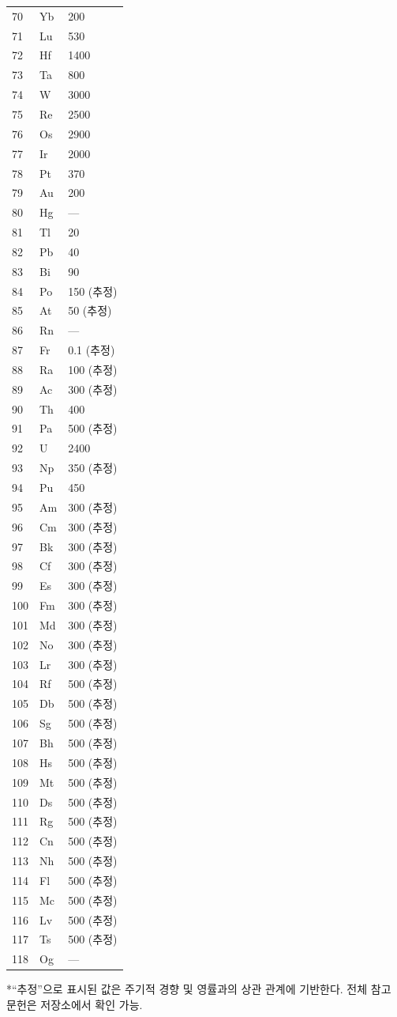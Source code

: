 \documentclass[12pt,a4paper]{article}
\begin{document}
\begin{longtable}{p{0.6cm}p{1.2cm}p{2.5cm}}
		70 & Yb & 200 \\
		71 & Lu & 530 \\
		72 & Hf & 1400 \\
		73 & Ta & 800 \\
		74 & W  & 3000 \\
		75 & Re & 2500 \\
		76 & Os & 2900 \\
		77 & Ir & 2000 \\
		78 & Pt & 370 \\
		79 & Au & 200 \\
		80 & Hg & — \\
		81 & Tl & 20 \\
		82 & Pb & 40 \\
		83 & Bi & 90 \\
		84 & Po & 150 (추정) \\
		85 & At & 50 (추정) \\
		86 & Rn & — \\
		87 & Fr & 0.1 (추정) \\
		88 & Ra & 100 (추정) \\
		89 & Ac & 300 (추정) \\
		90 & Th & 400 \\
		91 & Pa & 500 (추정) \\
		92 & U  & 2400 \\
		93 & Np & 350 (추정) \\
		94 & Pu & 450 \\
		95 & Am & 300 (추정) \\
		96 & Cm & 300 (추정) \\
		97 & Bk & 300 (추정) \\
		98 & Cf & 300 (추정) \\
		99 & Es & 300 (추정) \\
		100& Fm & 300 (추정) \\
		101& Md & 300 (추정) \\
		102& No & 300 (추정) \\
		103& Lr & 300 (추정) \\
		104& Rf & 500 (추정) \\
		105& Db & 500 (추정) \\
		106& Sg & 500 (추정) \\
		107& Bh & 500 (추정) \\
		108& Hs & 500 (추정) \\
		109& Mt & 500 (추정) \\
		110& Ds & 500 (추정) \\
		111& Rg & 500 (추정) \\
		112& Cn & 500 (추정) \\
		113& Nh & 500 (추정) \\
		114& Fl & 500 (추정) \\
		115& Mc & 500 (추정) \\
		116& Lv & 500 (추정) \\
		117& Ts & 500 (추정) \\
		118& Og & — \\
		\bottomrule
	\end{longtable}
	*“추정”으로 표시된 값은 주기적 경향 및 영률과의 상관 관계에 기반한다. 전체 참고 문헌은 저장소에서 확인 가능.
	
\end{document}
